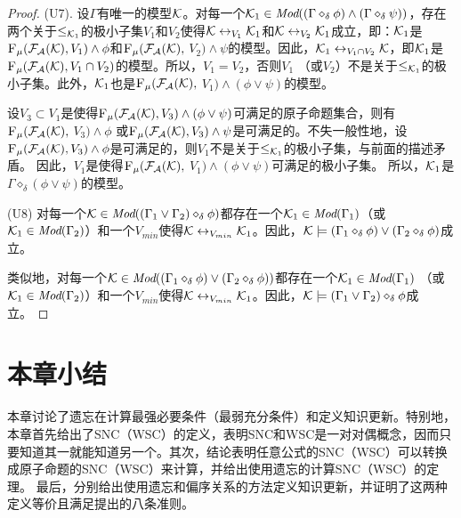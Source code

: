 \begin{proof}
	
	(U7). 设$\Gamma$有唯一的模型${\cal K}$。对每一个${\cal K}_1 \in \textit{Mod}((\Gamma \diamond_{\delta} \phi) \wedge (\Gamma \diamond_{\delta} \psi))$，存在两个关于$\leq_{{\cal K}_1}$的极小子集$V_1$和$V_2$使得${\cal K} \leftrightarrow_{V_1} {\cal K}_1$和${\cal K} \leftrightarrow_{V_2} {\cal K}_1$成立，即：${\cal K}_1$是${\textsc{F}_{\textsc{$\mu$}}}({\cal F}_{{\cal A}}({\cal K}), V_1) \wedge \phi$和${\textsc{F}_{\textsc{$\mu$}}}({\cal F}_{{\cal A}}({\cal K}),$ $V_2) \wedge \psi$的模型。因此，${\cal K}_1 \leftrightarrow_{V_1 \cap V_2} {\cal K}$，即${\cal K}_1$是${\textsc{F}_{\textsc{$\mu$}}}({\cal F}_{{\cal A}}({\cal K}), V_1 \cap V_2)$的模型。所以，$V_1 = V_2$，否则$V_1$ （或$V_2$）不是关于$\leq_{{\cal K}_1}$的极小子集。此外，${\cal K}_1$也是${\textsc{F}_{\textsc{$\mu$}}}({\cal F}_{{\cal A}}({\cal K}),$ $ V_1) \wedge (\phi \vee \psi)$的模型。
	
	设$V_3\subset V_1$是使得${\textsc{F}_{\textsc{$\mu$}}}({\cal F}_{{\cal A}}({\cal K}), V_3) \wedge (\phi \vee \psi)$可满足的原子命题集合，则有${\textsc{F}_{\textsc{$\mu$}}}({\cal F}_{{\cal A}}({\cal K}),$ $V_3) \wedge \phi$ 或${\textsc{F}_{\textsc{$\mu$}}}({\cal F}_{{\cal A}}({\cal K}), V_3) \wedge \psi$是可满足的。不失一般性地，设${\textsc{F}_{\textsc{$\mu$}}}({\cal F}_{{\cal A}}({\cal K}), V_3) \wedge \phi$是可满足的，则$V_1$不是关于$\leq_{{\cal K}_1}$的极小子集，与前面的描述矛盾。
	因此，$V_1$是使得${\textsc{F}_{\textsc{$\mu$}}}({\cal F}_{{\cal A}}({\cal K}),$ $V_1) \wedge (\phi \vee \psi)$可满足的极小子集。
	所以，${\cal K}_1$是$\Gamma \diamond_{\delta} (\phi \vee \psi)$的模型。
	
	(U8) 对每一个${\cal K} \in \textit{Mod}((\Gamma_1 \vee \Gamma_2) \diamond_{\delta} \phi)$都存在一个${\cal K}_1 \in \textit{Mod}(\Gamma_1)$（或${\cal K}_1\in \textit{Mod}(\Gamma_2)$）和一个$V_{min}$使得${\cal K} \leftrightarrow_{V_{min}} {\cal K}_1$。因此，${\cal K} \models  (\Gamma_1 \diamond_{\delta} \phi) \vee (\Gamma_2 \diamond_{\delta} \phi)$成立。
	
	类似地，对每一个${\cal K} \in \textit{Mod}( (\Gamma_1 \diamond_{\delta} \phi) \vee (\Gamma_2 \diamond_{\delta} \phi))$都存在一个${\cal K}_1\in \textit{Mod}(\Gamma_1)$ （或${\cal K}_1 \in \textit{Mod}(\Gamma_2)$）和一个$V_{min}$使得${\cal K} \leftrightarrow_{V_{min}} {\cal K}_1$。因此，${\cal K} \models (\Gamma_1 \vee \Gamma_2) \diamond_{\delta} \phi$成立。
\end{proof}

\section{本章小结}\label{sec:chapter07-conclusion}

本章讨论了遗忘在计算最强必要条件（最弱充分条件）和定义知识更新。特别地，本章首先给出了SNC（WSC）的定义，表明SNC和WSC是一对对偶概念，因而只要知道其一就能知道另一个。其次，结论表明任意公式的SNC（WSC）可以转换成原子命题的SNC（WSC）来计算，并给出使用遗忘的计算SNC（WSC）的定理。
最后，分别给出使用遗忘和偏序关系的方法定义知识更新，并证明了这两种定义等价且满足\citeauthor{katsuno91mendelzon}提出的八条准则。
